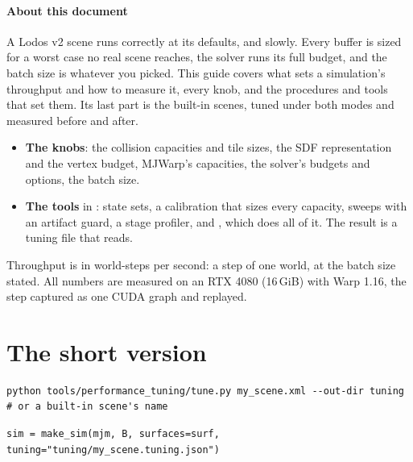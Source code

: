 



\paragraph{About this document}
A Lodos v2 scene runs correctly at its defaults, and slowly. Every buffer is sized for a worst case no real scene reaches, the solver runs its full budget, and the batch size is whatever you picked. This guide covers what sets a simulation's throughput and how to measure it, every knob, and the procedures and tools that set them. Its last part is the built-in scenes, tuned under both modes and measured before and after.

\begin{itemize}
\item \textbf{The knobs}: the collision capacities and tile sizes, the SDF representation and the vertex budget, MJWarp's capacities, the solver's budgets and options, the batch size.
\item \textbf{The tools} in : state sets, a calibration that sizes every capacity, sweeps with an artifact guard, a stage profiler, and , which does all of it. The result is a tuning file that  reads.
\end{itemize}

Throughput is in world-steps per second: a step of one world, at the batch size stated. All numbers are measured on an RTX 4080 (16\,GiB) with Warp 1.16, the step captured as one CUDA graph and replayed.

\setcounter{tocdepth}{2}
\tableofcontents

\section{The short version}\label{sec:short}

\begin{lstlisting}
python tools/performance_tuning/tune.py my_scene.xml --out-dir tuning     # or a built-in scene's name
\end{lstlisting}
\begin{lstlisting}
sim = make_sim(mjm, B, surfaces=surf, tuning="tuning/my_scene.tuning.json")
\end{lstlisting}

